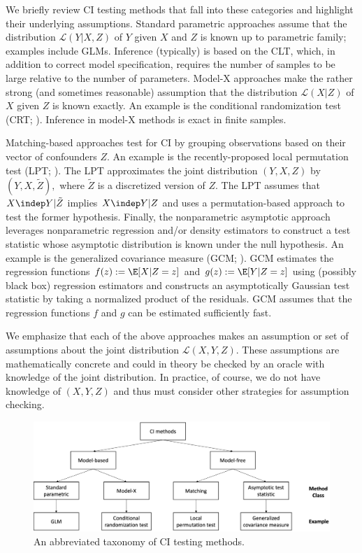 \documentclass[12pt]{article}
\begin{document}
We briefly review CI testing methods that fall into these categories and highlight their underlying assumptions. Standard parametric approaches assume that the distribution $\mathcal{L}(Y|X,Z)$ of $Y$ given $X$ and $Z$ is known up to parametric family; examples include GLMs. Inference (typically) is based on the CLT, which, in addition to correct model specification, requires the number of samples to be large relative to the number of parameters. Model-X approaches make the rather strong (and sometimes reasonable) assumption that the distribution $\mathcal{L}(X|Z)$ of $X$ given $Z$ is known exactly. An example is the conditional randomization test (CRT; \textcite{Candes2018a}). Inference in model-X methods is exact in finite samples.

Matching-based approaches test for CI by grouping observations based on their vector of confounders $Z$. An example is the recently-proposed local permutation test (LPT; \textcite{Kim2021}). The LPT approximates the joint distribution $(Y, X, Z)$ by $(Y, X, \tilde{Z}),$ where $\tilde{Z}$ is a discretized version of $Z$. The LPT assumes that $X \indep Y | \tilde{Z}$ implies $X \indep Y | Z$ and uses a permutation-based approach to test the former hypothesis. Finally, the nonparametric asymptotic approach leverages nonparametric regression and/or density estimators to construct a test statistic whose asymptotic distribution is known under the null hypothesis. An example is the generalized covariance measure (GCM; \textcite{Shah2020}). GCM estimates the regression functions $f(z) := \E[X|Z = z]$ and $g(z) := \E[Y|Z = z]$ using (possibly black box) regression estimators and constructs an asymptotically Gaussian test statistic by taking a normalized product of the residuals. GCM assumes that the regression functions $f$ and $g$ can be estimated sufficiently fast.

We emphasize that each of the above approaches makes an assumption or set of assumptions about the joint distribution $\mathcal{L}(X,Y,Z)$. These assumptions are mathematically concrete and could in theory be checked by an oracle with knowledge of the joint distribution. In practice, of course, we do not have knowledge of $(X,Y,Z)$ and thus must consider other strategies for assumption checking.

\begin{figure}
	\centering
	\includegraphics[width=1\linewidth]{../figs/CI_methods}
	\caption{An abbreviated taxonomy of CI testing methods.}
	\label{cimethods}
\end{figure}
\end{document}
